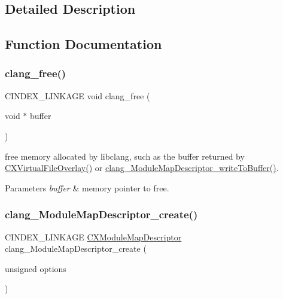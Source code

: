 \subsection{Detailed Description}


\subsection{Function Documentation}
\mbox{\label{group__BUILD__SYSTEM_ga3d7fcaba04ff8fcc4882e1bab6dcbee8}} 
\subsubsection{\texorpdfstring{clang\+\_\+free()}{clang\_free()}}
{\footnotesize\ttfamily C\+I\+N\+D\+E\+X\+\_\+\+L\+I\+N\+K\+A\+GE void clang\+\_\+free (\begin{DoxyParamCaption}\item[{void $\ast$}]{buffer }\end{DoxyParamCaption})}



free memory allocated by libclang, such as the buffer returned by {\ttfamily \mbox{\hyperlink{group__BUILD__SYSTEM_gae854e36ceb0a02071e557e19f908772d}{C\+X\+Virtual\+File\+Overlay()}}} or {\ttfamily \mbox{\hyperlink{group__BUILD__SYSTEM_gacaeaf475a29b16a041641b6ebe9a012d}{clang\+\_\+\+Module\+Map\+Descriptor\+\_\+write\+To\+Buffer()}}}. 


\begin{DoxyParams}{Parameters}
{\em buffer} & memory pointer to free. \\
\hline
\end{DoxyParams}
\mbox{\label{group__BUILD__SYSTEM_ga41bcb2ce427f6892d48bc21117b22274}} 
\subsubsection{\texorpdfstring{clang\+\_\+\+Module\+Map\+Descriptor\+\_\+create()}{clang\_ModuleMapDescriptor\_create()}}
{\footnotesize\ttfamily C\+I\+N\+D\+E\+X\+\_\+\+L\+I\+N\+K\+A\+GE \mbox{\hyperlink{group__BUILD__SYSTEM_ga8d7eea7855a8d1118218c7661469b3db}{C\+X\+Module\+Map\+Descriptor}} clang\+\_\+\+Module\+Map\+Descriptor\+\_\+create (\begin{DoxyParamCaption}\item[{unsigned}]{options }\end{DoxyParamCaption})}



